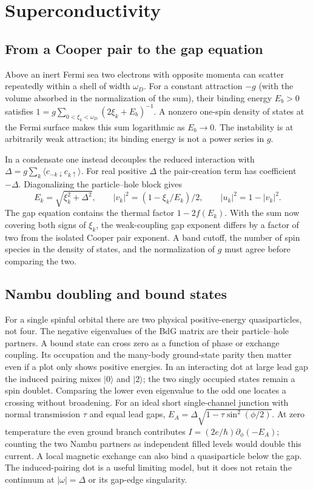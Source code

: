 \chapter{Superconductivity}
\section{From a Cooper pair to the gap equation}
Above an inert Fermi sea two electrons with opposite momenta can
scatter repeatedly within a shell of width $\omega_D$. For a constant
attraction $-g$ (with the volume absorbed in the normalization of the
sum), their binding energy $E_b>0$ satisfies
$1=g\sum_{0<\xi_k<\omega_D}(2\xi_k+E_b)^{-1}$. A nonzero one-spin
density of states at the Fermi surface makes this sum logarithmic as
$E_b\to0$. The instability is at arbitrarily weak attraction; its
binding energy is not a power series in $g$.

In a condensate one instead decouples the reduced interaction with
$\Delta=g\sum_k\langle c_{-k\downarrow}c_{k\uparrow}\rangle$.
For real positive $\Delta$ the pair-creation term has coefficient
$-\Delta$. Diagonalizing the particle--hole block gives
\[
 E_k=\sqrt{\xi_k^2+\Delta^2},\qquad
 |v_k|^2=(1-\xi_k/E_k)/2,\qquad |u_k|^2=1-|v_k|^2 .
\]
The gap equation contains the thermal factor $1-2f(E_k)$.
With the sum now covering both signs of $\xi_k$, the weak-coupling
gap exponent differs by a factor of two from the isolated Cooper
pair exponent. A band cutoff, the number of spin species in the
density of states, and the normalization of $g$ must agree before
comparing the two.

\section{Nambu doubling and bound states}
For a single spinful orbital there are two physical positive-energy
quasiparticles, not four. The negative eigenvalues of the BdG matrix
are their particle--hole partners. A bound state can cross zero as a
function of phase or exchange coupling. Its occupation and the
many-body ground-state parity then matter even if a plot only shows
positive energies. In an interacting dot at large lead gap the
induced pairing mixes $|0\rangle$ and $|2\rangle$; the two singly
occupied states remain a spin doublet. Comparing the lower even
eigenvalue to the odd one locates a crossing without broadening.
For an ideal short single-channel junction with normal transmission
$\tau$ and equal lead gaps, $E_A=\Delta\sqrt{1-\tau\sin^2(\phi/2)}$.
At zero temperature the even ground branch contributes
$I=(2e/\hbar)\partial_\phi(-E_A)$; counting the two Nambu partners
as independent filled levels would double this current. A local
magnetic exchange can also bind a quasiparticle below the gap.
The induced-pairing dot is a useful limiting model, but it does not
retain the continuum at $|\omega|=\Delta$ or its gap-edge singularity.
